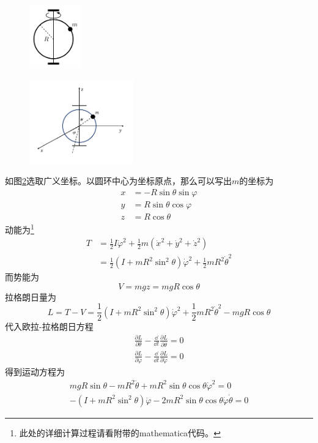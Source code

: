\begin{figure}[h]
	\centering
	\includegraphics[width=0.2\textwidth]{content/Figures/4-6}
	\caption{ }
	\label{fig:4-6}
\end{figure}
	
\begin{solution}
    \begin{figure}[h]
    	\centering
    	\includegraphics[width=0.4\textwidth]{content/Figures/4-6-1}
    	\caption{ }
    	\label{fig:4-6-1}
    \end{figure}
    如图\ref{fig:4-6-1}选取广义坐标。以圆环中心为坐标原点，那么可以写出\(m\)的坐标为
    \begin{align*}
    	x&=-R\sin{\theta}\sin{\varphi}\\
    	y&=R\sin{\theta}\cos{\varphi}\\
    	z&=R\cos{\theta}
    \end{align*}
    动能为\footnote{此处的详细计算过程请看附带的mathematica代码。}
    \begin{align*}
    	T&=\frac{1}{2}I \dot\varphi^2+\frac{1}{2}m(\dot{x}^2+\dot{y}^2+\dot{z}^2)\\
    	&=\frac{1}{2}(I+mR^2 \sin^2{\theta})\dot{\varphi}^2+\frac{1}{2}mR^2 \dot{\theta}^2
    \end{align*}
    而势能为
    \[V=mgz=mgR\cos{\theta}\]
    拉格朗日量为
    \[L=T-V=\frac{1}{2}(I+mR^2 \sin^2{\theta})\dot{\varphi}^2+\frac{1}{2}mR^2 \dot{\theta}^2-mgR\cos{\theta}\]
    代入欧拉-拉格朗日方程
    \begin{align*}
    	\frac{\partial L}{\partial \theta}-\frac{\dd}{\dd t}\frac{\partial L}{\partial \dot{\theta}}=0\\
    	\frac{\partial L}{\partial \varphi}-\frac{\dd}{\dd t}\frac{\partial L}{\partial \dot{\varphi}}=0
    \end{align*}
    得到运动方程为
    \begin{align*}
    	mgR \sin{\theta}-m R^2 \ddot{\theta}+m R^2 \sin{\theta} \cos{\theta} \dot{\varphi}^2=0\\
    	-\left(I+m R^2 \sin^2{\theta}\right)\ddot{\varphi} -2 m R^2 \sin{\theta} \cos{\theta}\dot{\varphi}\dot{\theta}=0
    \end{align*}
\end{solution}


